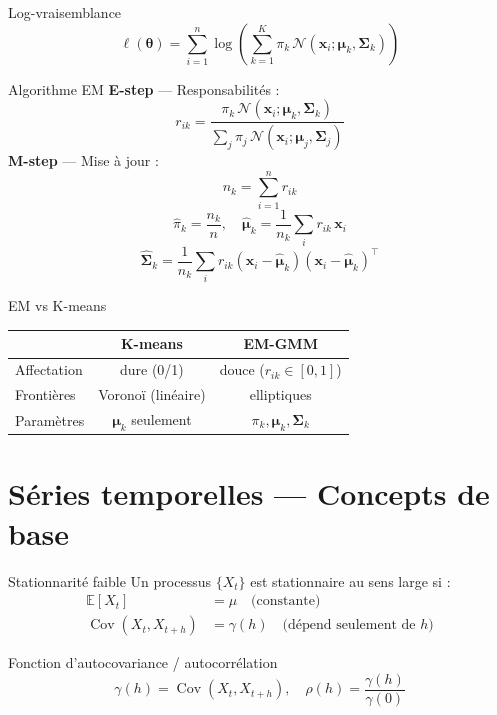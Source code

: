 \documentclass[10pt,a4paper,twocolumn]{article}
\newcommand{\E}{\mathbb{E}}
\newcommand{\Cov}{\operatorname{Cov}}
\newcommand{\T}{^{\!\top}}   %
\begin{document}
\begin{formulebox}{Log-vraisemblance}
\[
\ell(\bm{\theta}) = \sum_{i=1}^n \log\!\left(\sum_{k=1}^K \pi_k\,\mathcal{N}(\mathbf{x}_i;\bm{\mu}_k,\bm{\Sigma}_k)\right)
\]
\end{formulebox}

\begin{defbox}{Algorithme EM}
\textbf{E-step} — Responsabilités :
\[
r_{ik} = \frac{\pi_k\,\mathcal{N}(\mathbf{x}_i;\bm{\mu}_k,\bm{\Sigma}_k)}{\sum_j \pi_j\,\mathcal{N}(\mathbf{x}_i;\bm{\mu}_j,\bm{\Sigma}_j)}
\]
\textbf{M-step} — Mise à jour :
\[
n_k = \sum_{i=1}^n r_{ik}
\]
\[
\hat{\pi}_k = \frac{n_k}{n}, \quad
\hat{\bm{\mu}}_k = \frac{1}{n_k}\sum_i r_{ik}\,\mathbf{x}_i
\]
\[
\hat{\bm{\Sigma}}_k = \frac{1}{n_k}\sum_i r_{ik}(\mathbf{x}_i-\hat{\bm{\mu}}_k)(\mathbf{x}_i-\hat{\bm{\mu}}_k)\T
\]
\end{defbox}

\begin{defbox}{EM vs K-means}
\begin{tabular}{@{}lcc@{}}
\toprule
 & K-means & EM-GMM \\
\midrule
Affectation & dure (0/1) & douce ($r_{ik} \in [0,1]$) \\
Frontières & Voronoï (linéaire) & elliptiques \\
Paramètres & $\bm{\mu}_k$ seulement & $\pi_k,\bm{\mu}_k,\bm{\Sigma}_k$ \\
\bottomrule
\end{tabular}
\end{defbox}

\section{Séries temporelles — Concepts de base}

\begin{formulebox}{Stationnarité faible}
Un processus $\{X_t\}$ est stationnaire au sens large si :
\begin{align*}
\E[X_t] &= \mu \quad\text{(constante)}\\
\Cov(X_t, X_{t+h}) &= \gamma(h) \quad\text{(dépend seulement de }h\text{)}
\end{align*}
\end{formulebox}

\begin{formulebox}{Fonction d'autocovariance / autocorrélation}
\[
\gamma(h) = \Cov(X_t, X_{t+h}), \quad
\rho(h) = \frac{\gamma(h)}{\gamma(0)}
\]
\end{formulebox}
\end{document}
